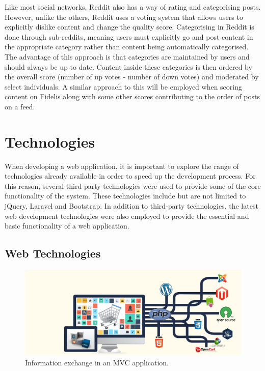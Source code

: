 Like most social networks, Reddit also has a way of rating and categorising posts. However, unlike the others, Reddit uses a voting system that allows users to explicitly dislike content and change the quality score. Categorising in Reddit is done through sub-reddits, meaning users must explicitly go and post content in the appropriate category rather than content being automatically categorised. The advantage of this approach is that categories are maintained by users and should always be up to date. Content inside these categories is then ordered by the overall score (number of up votes - number of down votes) and moderated by select individuals. A similar approach to this will be employed when scoring content on Fidelis along with some other scores contributing to the order of posts on a feed.

\section{Technologies}
\label{Section:Technologies}
When developing a web application, it is important to explore the range of technologies already available in order to speed up the development process. For this reason, several third party technologies were used to provide some of the core functionality of the system. These technologies include but are not limited to jQuery, Laravel and Bootstrap. In addition to third-party technologies, the latest web development technologies were also employed to provide the essential and basic functionality of a web application.

\subsection{Web Technologies} \label{Section:Web_Technologies}

\begin{figure}[H]
  \centering
  \includegraphics[width=1.0\textwidth]{Images/Research/Technologies/WebTechnologies}
  \caption{Information exchange in an MVC application.} \label{fig:WebTechnologies} 
\end{figure}

